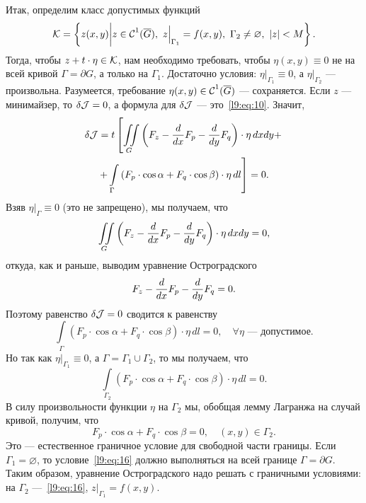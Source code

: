 Итак, определим класс допустимых функций
\begin{equation*}
	\K=\left\{z(x,y)\middle|z\in\Cfn{1}(\overline{G}),\ z\Big|_{\Gamma_1}=f(x,y),\ \Gamma_2\neq\varnothing,\ |z|<M\right\}.
\end{equation*}  
Тогда, чтобы $z+t\cdot\eta\in\mathcal{K}${\mb,} нам необходимо требовать, чтобы $\eta(x,y)\equiv0$ не на всей кривой $\Gamma=\partial G$, а только на $\Gamma_1$. Достаточно условия: $\eta\Big|_{\Gamma_1}\equiv0$, а $\eta\Big|_{\Gamma_2}$ --- произвольна. Разумеется, требование $\eta(x,y)\in\mathcal{C}{\mathstrut}^{1}_{}(\overline{G})$ --- сохраняется. Если $z$ --- минимайзер, то $\delta\mathcal{J}=0$, а формула для $\delta\mathcal{J}$ --- это~\eqref{l9:eq:10}. Значит{\mb,}
\begin{multline*}
	\delta\mathcal{J}=t\left[\iint\limits_{G}\left(F_z-\frac{d}{dx}F_p-\frac{d}{dy}F_q\right)\cdot\eta\,dxdy+\right.\\\left.+\int\limits_{\Gamma}\left(F_p\cdot\cos\alpha+F_q\cdot\cos\beta\right)\cdot\eta\,dl\right]=0.
\end{multline*}
Взяв $\eta\Big|_{\Gamma}\equiv0$ (это не запрещено){\mb,} мы получаем, что
\begin{equation*}
	\iint\limits_{G}\left(F_z-\frac{d}{dx}F_p-\frac{d}{dy}F_q\right)\cdot\eta\,dxdy=0,
\end{equation*}
откуда{\mb,} как и раньше{\mb,} выводим уравнение Остроградского
\begin{equation*}
	 F_z-\frac{d}{dx}F_p-\frac{d}{dy}F_q=0.
\end{equation*}
Поэтому равенство $\delta\mathcal{J}=0$ сводится к равенству
\begin{equation*}
	\int\limits_{\Gamma}(F_p\cdot\cos\alpha+F_q\cdot\cos\beta)\cdot\eta\,dl=0,\quad\forall\eta\text{ --- допустимое.}
\end{equation*}
Но так как $\eta\Big|_{\Gamma_1}\equiv0$, а $\Gamma=\Gamma_1\cup\Gamma_2$, то мы получаем, что
\begin{equation}\label{l9:eq:15}
	\int\limits_{\Gamma_2}(F_p\cdot\cos\alpha+F_q\cdot\cos\beta)\cdot\eta\,dl=0.
\end{equation}
В силу произвольности функции $\eta$ на $\Gamma_2$ мы, обобщая лемму Лагранжа на случай кривой, получим, что
\begin{equation}\label{l9:eq:16}
	 F_p\cdot\cos\alpha+F_q\cdot\cos\beta=0,\quad(x,y)\in\Gamma_2.
\end{equation}
Это --- естественное граничное условие для свободной части границы. Если $\Gamma_1=\varnothing$, то условие~\eqref{l9:eq:16} должно выполняться на всей границе $\Gamma=\partial G$. Таким образом{\mb,} уравнение Остроградского надо решать с граничными условиями: на $\Gamma_2$ ---~\eqref{l9:eq:16}, $z\Big|_{\Gamma_1}=f(x,y)$.

